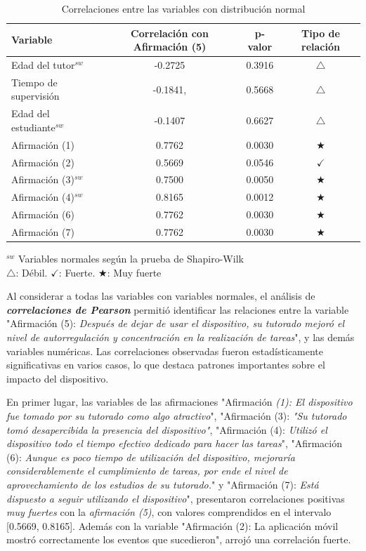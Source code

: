 \begin{table}[h!]
\centering
\caption{Correlaciones entre las variables con distribución normal}
\begin{tabularx}{0.75\textwidth}{Xccc}
	\toprule
	\textbf{Variable} & \textbf{Correlación con Afirmación (5)} &  \textbf{p-valor} & \textbf{Tipo de relación} \\
	\midrule
	Edad del tutor$^{sw}$ & -0.2725 & 0.3916 & \(\bigtriangleup\) \\ %
	Tiempo de supervisión & -0.1841, & 0.5668 & \(\bigtriangleup\) \\ %
	Edad del estudiante$^{sw}$ & -0.1407 & 0.6627 & \(\bigtriangleup\) \\ %
	Afirmación (1) & 0.7762 & 0.0030 & \(\bigstar\) \\ %
	Afirmación (2) & 0.5669 & 0.0546 & \(\checkmark\) \\ %
	Afirmación (3)$^{sw}$ & 0.7500 & 0.0050 & \(\bigstar\) \\ %
	Afirmación (4)$^{sw}$ & 0.8165 & 0.0012 & \(\bigstar\) \\ %
	Afirmación (6) & 0.7762 & 0.0030 & \(\bigstar\) \\ %
	Afirmación (7) & 0.7762 & 0.0030 & \(\bigstar\) \\ %
	\bottomrule
\end{tabularx}
\label{table:Pearson-Correlation}
\vspace{0.3em} %
\parbox{0.75\textwidth}{\footnotesize
	$^{sw}$ Variables normales según la prueba de Shapiro-Wilk\\
	\(\bigtriangleup\): Débil. \(\checkmark\): Fuerte. \(\bigstar\): Muy fuerte
}
\end{table}

Al considerar a todas las variables con variables normales, el análisis de \textit{\textbf{correlaciones de Pearson}} permitió identificar las relaciones entre la variable "Afirmación (5): \textit{Después de dejar de usar el dispositivo, su tutorado mejoró el nivel de autorregulación y concentración en la realización de tareas}", y las demás variables numéricas. Las correlaciones observadas fueron estadísticamente significativas en varios casos, lo que destaca patrones importantes sobre el impacto del dispositivo.

En primer lugar, las variables de las afirmaciones "Afirmación \textit{(1): El dispositivo fue tomado por su tutorado como algo atractivo}", "Afirmación (3): \textit{"Su tutorado tomó desapercibida la presencia del dispositivo"}, "Afirmación (4): \textit{Utilizó el dispositivo todo el tiempo efectivo dedicado para hacer las tareas}", "Afirmación (6): \textit{Aunque es poco tiempo de utilización del dispositivo, mejoraría considerablemente el cumplimiento de tareas, por ende el nivel de aprovechamiento de los estudios de su tutorado.}" y "Afirmación (7): \textit{Está dispuesto a seguir utilizando el dispositivo}", presentaron correlaciones positivas \textit{muy fuertes} con la \textit{afirmación (5)}, con valores comprendidos en el intervalo [0.5669, 0.8165]. Además con la variable "Afirmación (2): La aplicación móvil mostró correctamente los eventos que sucedieron", arrojó una correlación fuerte.

